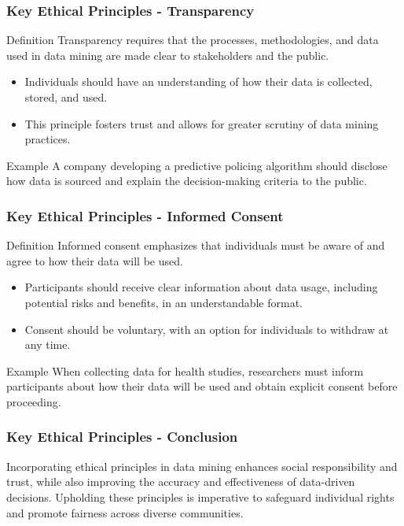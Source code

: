 \documentclass{beamer}
\begin{document}
\begin{frame}[fragile]
    \frametitle{Key Ethical Principles - Transparency}
    \begin{block}{Definition}
    Transparency requires that the processes, methodologies, and data used in data mining are made clear to stakeholders and the public.
    \end{block}
    \begin{itemize}
        \item Individuals should have an understanding of how their data is collected, stored, and used.
        \item This principle fosters trust and allows for greater scrutiny of data mining practices.
    \end{itemize}
    \begin{block}{Example}
    A company developing a predictive policing algorithm should disclose how data is sourced and explain the decision-making criteria to the public.
    \end{block}
\end{frame}

\begin{frame}[fragile]
    \frametitle{Key Ethical Principles - Informed Consent}
    \begin{block}{Definition}
    Informed consent emphasizes that individuals must be aware of and agree to how their data will be used.
    \end{block}
    \begin{itemize}
        \item Participants should receive clear information about data usage, including potential risks and benefits, in an understandable format.
        \item Consent should be voluntary, with an option for individuals to withdraw at any time.
    \end{itemize}
    \begin{block}{Example}
    When collecting data for health studies, researchers must inform participants about how their data will be used and obtain explicit consent before proceeding.
    \end{block}
\end{frame}

\begin{frame}[fragile]
    \frametitle{Key Ethical Principles - Conclusion}
    Incorporating ethical principles in data mining enhances social responsibility and trust, while also improving the accuracy and effectiveness of data-driven decisions. Upholding these principles is imperative to safeguard individual rights and promote fairness across diverse communities.
\end{frame}
\end{document}
